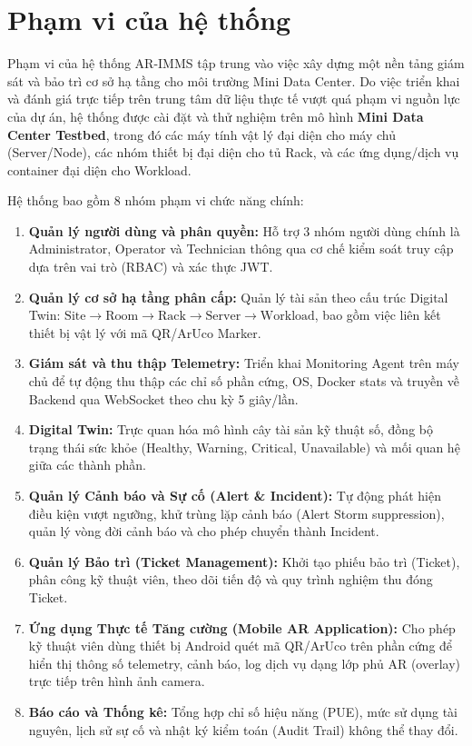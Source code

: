 \section{Phạm vi của hệ thống}
Phạm vi của hệ thống AR-IMMS tập trung vào việc xây dựng một nền tảng giám sát và bảo trì cơ sở hạ tầng cho môi trường Mini Data Center. Do việc triển khai và đánh giá trực tiếp trên trung tâm dữ liệu thực tế vượt quá phạm vi nguồn lực của dự án, hệ thống được cài đặt và thử nghiệm trên mô hình \textbf{Mini Data Center Testbed}, trong đó các máy tính vật lý đại diện cho máy chủ (Server/Node), các nhóm thiết bị đại diện cho tủ Rack, và các ứng dụng/dịch vụ container đại diện cho Workload.

Hệ thống bao gồm 8 nhóm phạm vi chức năng chính:
\begin{enumerate}
    \item \textbf{Quản lý người dùng và phân quyền:} Hỗ trợ 3 nhóm người dùng chính là Administrator, Operator và Technician thông qua cơ chế kiểm soát truy cập dựa trên vai trò (RBAC) và xác thực JWT.
    \item \textbf{Quản lý cơ sở hạ tầng phân cấp:} Quản lý tài sản theo cấu trúc Digital Twin: $\text{Site} \rightarrow \text{Room} \rightarrow \text{Rack} \rightarrow \text{Server} \rightarrow \text{Workload}$, bao gồm việc liên kết thiết bị vật lý với mã QR/ArUco Marker.
    \item \textbf{Giám sát và thu thập Telemetry:} Triển khai Monitoring Agent trên máy chủ để tự động thu thập các chỉ số phần cứng, OS, Docker stats và truyền về Backend qua WebSocket theo chu kỳ 5 giây/lần.
    \item \textbf{Digital Twin:} Trực quan hóa mô hình cây tài sản kỹ thuật số, đồng bộ trạng thái sức khỏe (Healthy, Warning, Critical, Unavailable) và mối quan hệ giữa các thành phần.
    \item \textbf{Quản lý Cảnh báo và Sự cố (Alert \& Incident):} Tự động phát hiện điều kiện vượt ngưỡng, khử trùng lặp cảnh báo (Alert Storm suppression), quản lý vòng đời cảnh báo và cho phép chuyển thành Incident.
    \item \textbf{Quản lý Bảo trì (Ticket Management):} Khởi tạo phiếu bảo trì (Ticket), phân công kỹ thuật viên, theo dõi tiến độ và quy trình nghiệm thu đóng Ticket.
    \item \textbf{Ứng dụng Thực tế Tăng cường (Mobile AR Application):} Cho phép kỹ thuật viên dùng thiết bị Android quét mã QR/ArUco trên phần cứng để hiển thị thông số telemetry, cảnh báo, log dịch vụ dạng lớp phủ AR (overlay) trực tiếp trên hình ảnh camera.
    \item \textbf{Báo cáo và Thống kê:} Tổng hợp chỉ số hiệu năng (PUE), mức sử dụng tài nguyên, lịch sử sự cố và nhật ký kiểm toán (Audit Trail) không thể thay đổi.
\end{enumerate}

